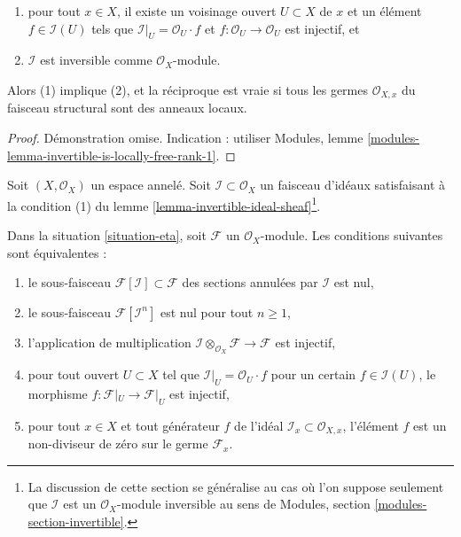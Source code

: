 {\begin{lemma}
\begin{enumerate}

\item pour tout $x \in X$, il existe un voisinage ouvert
$U \subset X$ de $x$ et un élément $f \in \mathcal{I}(U)$ tels que
$\mathcal{I}|_U = \mathcal{O}_U \cdot f$ et
$f : \mathcal{O}_U \to \mathcal{O}_U$ est injectif, et
\item  $\mathcal{I}$ est inversible comme $\mathcal{O}_X$-module.

\end{enumerate}

Alors (1) implique (2), et la réciproque est vraie si tous les germes
$\mathcal{O}_{X, x}$ du faisceau structural sont des anneaux locaux.

\end{lemma}

\begin{proof}
Démonstration omise. Indication : utiliser Modules, lemme \ref{modules-lemma-invertible-is-locally-free-rank-1}.
\end{proof}

\begin{situation}

\label{situation-eta}
Soit $(X, \mathcal{O}_X)$ un espace annelé. Soit $\mathcal{I} \subset \mathcal{O}_X$ un faisceau d'idéaux satisfaisant à la condition (1) du lemme \ref{lemma-invertible-ideal-sheaf}\footnote{La discussion de cette section se généralise au cas où l'on suppose seulement que $\mathcal{I}$ est un $\mathcal{O}_X$-module inversible au sens de Modules, section \ref{modules-section-invertible}.}.
\end{situation}

\begin{lemma}

\label{lemma-I-torsion-free}

Dans la situation \ref{situation-eta},
soit $\mathcal{F}$ un $\mathcal{O}_X$-module. Les conditions suivantes sont équivalentes :

\begin{enumerate}

\item le sous-faisceau $\mathcal{F}[\mathcal{I}] \subset \mathcal{F}$
des sections annulées par $\mathcal{I}$ est nul,
\item le sous-faisceau $\mathcal{F}[\mathcal{I}^n]$ est nul pour tout $n \geq 1$,
\item l'application de multiplication
$\mathcal{I} \otimes_{\mathcal{O}_X} \mathcal{F} \to \mathcal{F}$
est injectif,
\item pour tout ouvert $U \subset X$ tel que
$\mathcal{I}|_U = \mathcal{O}_U \cdot f$
pour un certain $f \in \mathcal{I}(U)$,
le morphisme $f : \mathcal{F}|_U \to \mathcal{F}|_U$ est injectif,
\item pour tout $x \in X$ et tout générateur $f$ de l'idéal
$\mathcal{I}_x \subset \mathcal{O}_{X, x}$, l'élément $f$
est un non-diviseur de zéro sur le germe $\mathcal{F}_x$.


\end{enumerate}
\end{lemma}}
